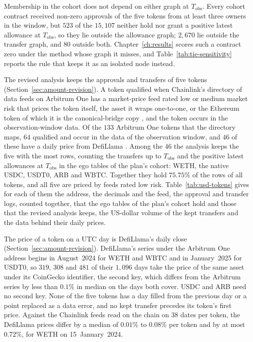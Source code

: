 Membership in the cohort does not depend on either graph at $T_{\text{obs}}$. Every cohort contract received non-zero approvals of the five tokens from at least three owners in the window, but $523$ of the $15{,}107$ neither hold nor grant a positive latest allowance at $T_{\text{obs}}$, so they lie outside the allowance graph; $2{,}670$ lie outside the transfer graph, and $80$ outside both. Chapter~\ref{ch:results} scores such a contract zero under the method whose graph it misses, and Table~\ref{tab:tie-sensitivity} reports the rule that keeps it as an isolated node instead.


The revised analysis keeps the approvals and transfers of five tokens (Section~\ref{sec:amount-revision}). A token qualified when Chainlink's directory of data feeds on Arbitrum One has a market-price feed rated low or medium market risk that prices the token itself, the asset it wraps one-to-one, or the Ethereum token of which it is the canonical-bridge copy \parencite{chainlinknddatafeeds}, and the token occurs in the observation-window data. Of the $133$ Arbitrum One tokens that the directory maps, $64$ qualified and occur in the data of the observation window, and $46$ of these have a daily price from DefiLlama \parencite{defillamanddocs}. Among the $46$ the analysis keeps the five with the most rows, counting the transfers up to $T_{\text{obs}}$ and the positive latest allowances at $T_{\text{obs}}$ in the ego tables of the plan's cohort: WETH, the native USDC, USDT0, ARB and WBTC. Together they hold $75.75\%$ of the rows of all tokens, and all five are priced by feeds rated low risk. Table~\ref{tab:usd-tokens} gives for each of them the address, the decimals and the feed, the approval and transfer logs, counted together, that the ego tables of the plan's cohort hold and those that the revised analysis keeps, the US-dollar volume of the kept transfers and the data behind their daily prices.


The price of a token on a UTC day is DefiLlama's daily close (Section~\ref{sec:amount-revision}). DefiLlama's series under the Arbitrum One address begins in August~2024 for WETH and WBTC and in January~2025 for USDT0, so $319$, $308$ and $481$ of their $1{,}096$ days take the price of the same asset under its CoinGecko identifier, the second key, which differs from the Arbitrum series by less than $0.1\%$ in median on the days both cover. USDC and ARB need no second key. None of the five tokens has a day filled from the previous day or a point replaced as a data error, and no kept transfer precedes its token's first price. Against the Chainlink feeds read on the chain on $38$ dates per token, the DefiLlama prices differ by a median of $0.01\%$ to $0.08\%$ per token and by at most $0.72\%$, for WETH on 15~January~2024.


